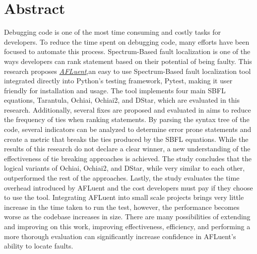 \chapter*{Abstract}

Debugging code is one of the most time consuming and costly tasks for
developers. To reduce the time spent on debugging code, many efforts have been
focused to automate this process. Spectrum-Based fault localization is one of
the ways developers can rank statement based on their potential of being faulty.
This research proposes \href{https://github.com/noorbuchi/AFLuent}{\emph{AFLuent}},an easy to use Spectrum-Based
fault localization tool integrated directly into Python's testing framework,
Pytest, making it user friendly for installation and usage. The
tool implements four main SBFL equations, Tarantula, Ochiai, Ochiai2, and DStar,
which are evaluated in this research. Additionally, several fixes are
proposed and evaluated in aims to reduce the frequency of ties when ranking
statements. By parsing the syntax tree of the code, several indicators can be
analyzed to determine error prone statements and create a metric that breaks
the ties produced by the SBFL equations. While the results of this research do
not declare a clear winner, a new understanding of the effectiveness of
tie breaking approaches is achieved. The study concludes that the logical
variants of Ochiai, Ochiai2, and DStar, while very similar to each other,
outperformed the rest of the approaches. Lastly, the study evaluates the time
overhead introduced by AFLuent and the cost developers must pay if they choose
to use the tool. Integrating AFLuent into small scale projects brings very
little increase in the time taken to run the test, however, the performance
becomes worse as the codebase increases in size. There are many possibilities of extending
and improving on this work, improving effectiveness, efficiency, and performing
a more thorough evaluation can significantly increase confidence in AFLuent's
ability to locate faults.